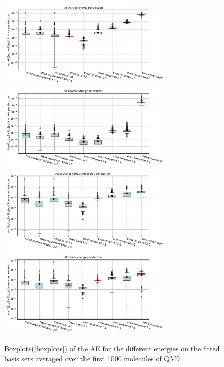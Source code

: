 \begin{figure}
    \centering
    \includegraphics[width=0.75\textwidth]{chapters/results/results_images/AE_hartree_energy_on_hartree+external_MOFDFT_for_different_basis_sets}
    \includegraphics[width=0.75\textwidth]{chapters/results/results_images/AE_ext_energy_on_hartree+external_MOFDFT_for_different_basis_sets}
    \includegraphics[width=0.75\textwidth]{chapters/results/results_images/AE_xc_energy_on_hartree+external_MOFDFT_for_different_basis_sets}
    \includegraphics[width=0.75\textwidth]{chapters/results/results_images/AE_kin_energy_on_hartree+external_MOFDFT_for_different_basis_sets}
    \caption{Boxplots(\ref{boxplots}) of the AE for the different energies on the fitted basis sets averaged over the first 1000 molecules of QM9} \label{fig:AE_energies_basis_sets}
\end{figure}
